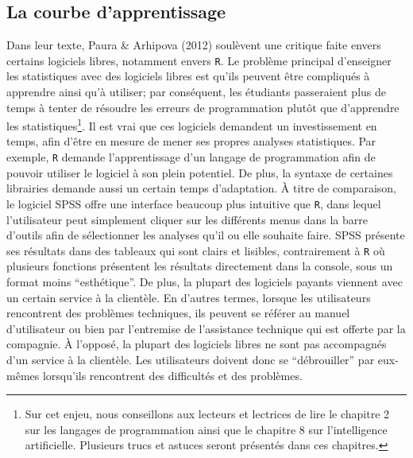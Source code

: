 \documentclass[
  letterpaper,
  DIV=11,
  numbers=noendperiod]{scrreprt}
\begin{document}
\subsection{La courbe d'apprentissage}\label{la-courbe-dapprentissage}

Dans leur texte, Paura \& Arhipova (2012) soulèvent une critique faite
envers certains logiciels libres, notamment envers \texttt{R}. Le
problème principal d'enseigner les statistiques avec des logiciels
libres est qu'ils peuvent être compliqués à apprendre ainsi qu'à
utiliser; par conséquent, les étudiants passeraient plus de temps à
tenter de résoudre les erreurs de programmation plutôt que d'apprendre
les statistiques\footnote{Sur cet enjeu, nous conseillons aux lecteurs
  et lectrices de lire le chapitre 2 sur les langages de programmation
  ainsi que le chapitre 8 sur l'intelligence artificielle. Plusieurs
  trucs et astuces seront présentés dans ces chapitres.}. Il est vrai
que ces logiciels demandent un investissement en temps, afin d'être en
mesure de mener ses propres analyses statistiques. Par exemple,
\texttt{R} demande l'apprentissage d'un langage de programmation afin de
pouvoir utiliser le logiciel à son plein potentiel. De plus, la syntaxe
de certaines librairies demande aussi un certain temps d'adaptation. À
titre de comparaison, le logiciel SPSS offre une interface beaucoup plus
intuitive que \texttt{R}, dans lequel l'utilisateur peut simplement
cliquer sur les différents menus dans la barre d'outils afin de
sélectionner les analyses qu'il ou elle souhaite faire. SPSS présente
ses résultats dans des tableaux qui sont clairs et lisibles,
contrairement à \texttt{R} où plusieurs fonctions présentent les
résultats directement dans la console, sous un format moins
``esthétique''. De plus, la plupart des logiciels payants viennent avec
un certain service à la clientèle. En d'autres termes, lorsque les
utilisateurs rencontrent des problèmes techniques, ils peuvent se
référer au manuel d'utilisateur ou bien par l'entremise de l'assistance
technique qui est offerte par la compagnie. À l'opposé, la plupart des
logiciels libres ne sont pas accompagnés d'un service à la clientèle.
Les utilisateurs doivent donc se ``débrouiller'' par eux-mêmes
lorsqu'ils rencontrent des difficultés et des problèmes.
\end{document}
